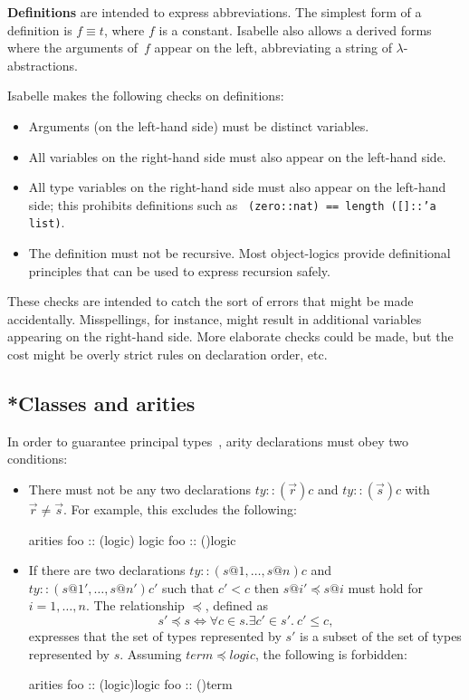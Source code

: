 {\bf Definitions} are intended to express abbreviations. The simplest
form of a definition is $f \equiv t$, where $f$ is a constant.
Isabelle also allows a derived forms where the arguments of~$f$ appear
on the left, abbreviating a string of $\lambda$-abstractions.

Isabelle makes the following checks on definitions:
\begin{itemize}
\item Arguments (on the left-hand side) must be distinct variables.
\item All variables on the right-hand side must also appear on the left-hand
  side. 
\item All type variables on the right-hand side must also appear on
  the left-hand side; this prohibits definitions such as {\tt
    (zero::nat) == length ([]::'a list)}.
\item The definition must not be recursive.  Most object-logics provide
  definitional principles that can be used to express recursion safely.
\end{itemize}
These checks are intended to catch the sort of errors that might be made
accidentally.  Misspellings, for instance, might result in additional
variables appearing on the right-hand side.  More elaborate checks could be
made, but the cost might be overly strict rules on declaration order, etc.


\subsection{*Classes and arities}

In order to guarantee principal types~\cite{nipkow-prehofer},
arity declarations must obey two conditions:
\begin{itemize}
\item There must not be any two declarations $ty :: (\vec{r})c$ and
  $ty :: (\vec{s})c$ with $\vec{r} \neq \vec{s}$.  For example, this
  excludes the following:
\begin{ttbox}
arities
  foo :: ({\ttlbrace}logic{\ttrbrace}) logic
  foo :: ({\ttlbrace}{\ttrbrace})logic
\end{ttbox}

\item If there are two declarations $ty :: (s@1,\dots,s@n)c$ and $ty ::
  (s@1',\dots,s@n')c'$ such that $c' < c$ then $s@i' \preceq s@i$ must hold
  for $i=1,\dots,n$.  The relationship $\preceq$, defined as
\[ s' \preceq s \iff \forall c\in s. \exists c'\in s'.~ c'\le c, \]
expresses that the set of types represented by $s'$ is a subset of the
set of types represented by $s$.  Assuming $term \preceq logic$, the
following is forbidden:
\begin{ttbox}
arities
  foo :: ({\ttlbrace}logic{\ttrbrace})logic
  foo :: ({\ttlbrace}{\ttrbrace})term
\end{ttbox}

\end{itemize}


